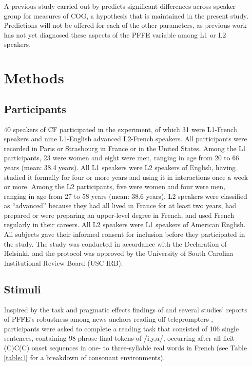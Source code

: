 \documentclass[output=paper,colorlinks,citecolor=brown,draftmode]{langscibook}
\begin{document}
A previous study carried out by \citet{dalola2020redefining} predicts significant differences across speaker group for measures of COG, a hypothesis that is maintained in the present study. Predictions will not be offered for each of the other parameters, as previous work has not yet diagnosed these aspects of the PFFE variable among L1 or L2 speakers.

\section{Methods}
\subsection{Participants}
40 speakers of CF participated in the experiment, of which 31 were L1-French speakers and nine L1-English advanced L2-French speakers. All participants were recorded in Paris or Strasbourg in France or in the United States. Among the L1 participants, 23 were women and eight were men, ranging in age from 20 to 66 years (mean: 38.4 years). All L1 speakers were L2 speakers of English, having studied it formally for four or more years and using it in interactions once a week or more. Among the L2 participants, five were women and four were men, ranging in age from 27 to 58 years (mean: 38.6 years). L2 speakers were classified as “advanced” because they had all lived in France for at least two years, had prepared or were preparing an upper-level degree in French, and used French regularly in their careers. All L2 speakers were L1 speakers of American English. All subjects gave their informed consent for inclusion before they participated in the study. The study was conducted in accordance with the Declaration of Helsinki, and the protocol was approved by the University of South Carolina Institutional Review Board (USC IRB).

\subsection{Stimuli}
Inspired by the task and pragmatic effects findings of \citet{dalola2017sociophonetic} and several studies’ reports of PFFE’s robustness among news anchors reading off teleprompters \citep{paternostro2008devoisement,candea2012journal,candea2013recent}, participants were asked to complete a reading task that consisted of 106 single sentences, containing 98 phrase-final tokens of /i,y,u/, occurring after all licit (C)C(C) onset sequences in one- to three-syllable real words in French (see Table \ref{table:1} for a breakdown of consonant environments).
\end{document}
